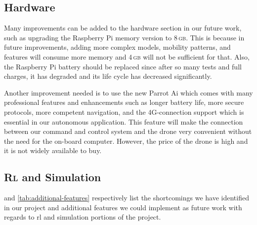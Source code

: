\documentclass[../main.tex]{subfiles}
\begin{document}
\subsection{Hardware}

Many improvements can be added to the hardware section in our future work,
such as upgrading the Raspberry Pi memory version to 8\,\textsc{gb}.
This is because in future improvements, adding more complex models,
mobility patterns, and features will consume more memory and
4\,\textsc{gb} will not be sufficient for that.
Also, the Raspberry Pi battery should be replaced since after so many
tests and full charges, it has degraded and its life cycle has
decreased significantly. 

Another improvement needed is to use the new Parrot \anafi Ai which comes
with many professional features and enhancements such as longer
battery life, more secure protocols, more competent navigation, and
the 4G-connection support which is essential in our autonomous
application.
This feature will make the connection between our command and control
system and the drone very convenient without the need for the on-board
computer. 
However, the price of the drone is high and it is not widely
available to buy.

\subsection{\textsc{Rl} and Simulation}

 and \cref{tab:additional-features} respectively list
the shortcomings we have identified in our project and
additional features we could implement as future work with regards to
\gls{rl} and simulation portions of the project.
\end{document}
